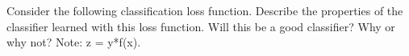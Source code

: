 Consider the following classification loss function. Describe the properties of the classifier learned with this loss function. Will this be a good classifier? Why or why not? Note: z = y*f(x).


